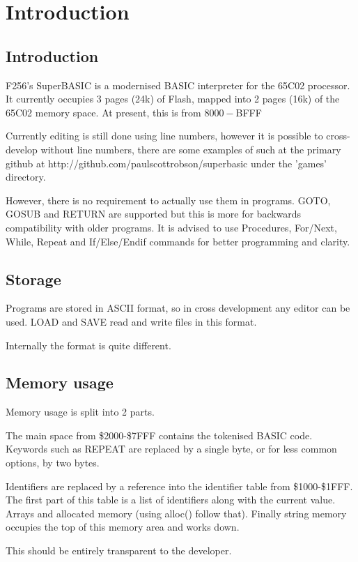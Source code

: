 \chapter{Introduction}

\section{Introduction}

F256's SuperBASIC is a modernised BASIC interpreter for the 65C02 processor. It currently occupies 3 pages (24k) of Flash, mapped into 2 pages (16k) of the 65C02 memory space. At present, this is from $8000-$BFFF

Currently editing is still done using line numbers, however it is possible to cross-develop without line numbers, there are some examples of such at the primary github at http://github.com/paulscottrobson/superbasic under the 'games' directory.

However, there is no requirement to actually use them in programs. GOTO, GOSUB and RETURN are supported but this is more for backwards compatibility with older programs. It is advised to use Procedures, For/Next, While, Repeat and If/Else/Endif commands for better programming and clarity.

\section{Storage}

Programs are stored in ASCII format, so in cross development any editor can be used. LOAD and SAVE read and write files in this format. 

Internally the format is quite different.

\section{Memory usage}

Memory usage is split into 2 parts. 

The main space from \$2000-\$7FFF contains the tokenised BASIC code. Keywords such as REPEAT are replaced by a single byte, or for less common options, by two bytes. 

Identifiers are replaced by a reference into the identifier table from \$1000-\$1FFF. The first part of this table is a list of identifiers along with the current value.
Arrays and allocated memory (using alloc() follow that).
Finally string memory occupies the top of this memory area and works down.

This should be entirely transparent to the developer.

